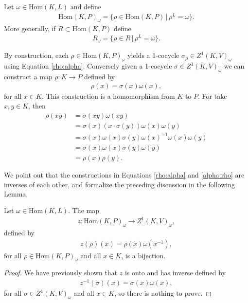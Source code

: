 \begin{definition} Let $\omega \in \mathrm{Hom}(K, L)$ and define
\begin{align*} \mathrm{Hom}(K, P)_\omega = \{ \rho \in \mathrm{Hom}(K, P) \,|\, \rho^L = \omega\}. \end{align*}
More generally, if $R \subset \mathrm{Hom}(K, P)$ define
\begin{align*} R_\omega = \{ \rho \in R \,|\, \rho^L = \omega \}. \end{align*}
\end{definition}

By construction, each $\rho \in \mathrm{Hom}(K, P)_\omega$ yields a 1-cocycle $\sigma_\rho \in Z^1(K, V)_\omega$ using Equation \ref{rho:alpha}.
Conversely given a 1-cocycle $\sigma \in Z^1(K, V)_\omega$ we can construct a map $\rho: K \rightarrow P$ defined by
\begin{align}\label{alpha:rho}
\rho(x) = \sigma(x)\omega(x),
\end{align}
for all $x \in K$. This construction is a homomorphism from $K$ to $P$. For take $x, y \in K$, then
\begin{align*}
  \rho(x y) &= \sigma(x y) \omega(x y) \\
  &= \sigma(x)(x \cdot \sigma(y)) \omega(x) \omega(y) \\
  &= \sigma(x) \omega(x) \sigma(y) \omega(x)^{-1} \omega(x) \omega(y) \\
  &= \sigma(x) \omega(x) \sigma(y) \omega(y) \\
  &= \rho(x) \rho(y).
\end{align*}

We point out that the constructions in Equations \ref{rho:alpha} and \ref{alpha:rho} are inverses of each other, and formalize the preceding discussion in the following Lemma.

\begin{lemma}
  Let $\omega \in \mathrm{Hom}(K, L)$. The map
\begin{align*} z: \mathrm{Hom}(K, P)_{\omega} \rightarrow Z^1(K, V)_\omega, \end{align*}
defined by
\begin{align*} z(\rho)(x) = \rho(x)\omega(x^{-1}), \end{align*}
for all $\rho \in \mathrm{Hom}(K, P)_\omega$ and all $x \in K$, is a bijection.
\label{lem:hom_z1}
\end{lemma}
\begin{proof}
We have previously shown that $z$ is onto and has inverse defined by
\begin{align*} z^{-1}(\sigma)(x) = \sigma(x)\omega(x), \end{align*}
for all $\sigma \in Z^1(K, V)_\omega$ and all $x \in K$, so there is nothing to prove.
\end{proof}


